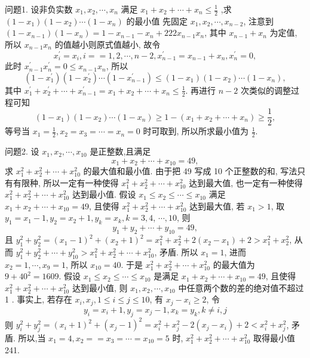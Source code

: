 
问题1. 设非负实数 $x_1,x_2,\cdots,x_n$ 满足 $x_{1}+x_{2}+\cdots+x_{n}\leq{\frac{1}{2}}$ ,求$(1-x_1)(1-x_2)\cdots(1-x_{n})$ 的最小值
先固定 $x_1, x_2, \cdots, x_{n-2}$, 注意到 $\left(1-x_{n-1}\right)\left(1-x_n\right)=1-x_{n-1}-x_n+ 222 x_{n-1} x_n$, 其中 $x_{n-1}+x_n$ 为定值, 所以 $x_{n-1} x_n$ 的值越小则原式值越小, 故令
$$
x_i^{\prime}=x_i, i==1,2, \cdots, n-2, x_{n-1}^{\prime}=x_{n-1}+x_n, x_n^{\prime}=0,
$$
此时 $x_{n-1}^{\prime} x_n^{\prime}=0 \leqslant x_{n-1} x_n$, 所以
$$
\left(1-x_1^{\prime}\right)\left(1-x_2^{\prime}\right) \cdots\left(1-x_{n-1}^{\prime}\right) \leqslant\left(1-x_1\right)\left(1-x_2\right) \cdots\left(1-x_n\right),
$$
其中 $x_1^{\prime}+x_2^{\prime}+\cdots+x_{n-1}^{\prime}=x_1+x_2+\cdots+x_n \leqslant \frac{1}{2}$.
再进行 $n-2$ 次类似的调整过程可知
$$
\left(1-x_1\right)\left(1-x_2\right) \cdots\left(1-x_n\right) \geqslant 1-\left(x_1+x_2+\cdots+x_n\right) \geqslant \frac{1}{2},
$$
等号当 $x_1=\frac{1}{2}, x_2=x_3=\cdots=x_n=0$ 时可取到, 所以所求最小值为 $\frac{1}{2}$.



问题2. 设 $x_1, x_2, \cdots, x_{10}$ 是正整数,且满足
$$
x_1+x_2+\cdots+x_{10}=49,
$$
求 $x_1^2+x_2^2+\cdots+x_{10}^2$ 的最大值和最小值.
由于把 49 写成 10 个正整数的和, 写法只有有限种, 所以一定有一种使得 $x_1^2+x_2^2+\cdots+x_{10}^2$ 达到最大值, 也一定有一种使得 $x_1^2+x_2^2+\cdots+x_{10}^2$ 达到最小值.
假设 $x_1 \leqslant x_2 \leqslant \cdots \leqslant x_{10}$ 满足 $x_1+x_2+\cdots+x_{10}=49$, 且使得 $x_1^2+x_2^2+\cdots +x_{10}^2$ 达到最大值, 若 $x_1>1$, 取 $y_1=x_1-1, y_2=x_2+1, y_k=x_k, k=3,4$,
$\cdots, 10$, 则
$$
y_1+y_2+\cdots+y_{10}=49,
$$
且 $y_1^2+y_2^2=\left(x_1-1\right)^2+\left(x_2+1\right)^2=x_1^2+x_2^2+2\left(x_2-x_1\right)+2>x_1^2+x_2^2$, 从而 $y_1^2+y_2^2+\cdots+y_{10}^2>x_1^2+x_2^2+\cdots+x_{10}^2$, 矛盾.
所以 $x_1=1$, 进而 $x_2=1, \cdots, x_9=1$, 所以 $x_{10}=40$. 于是 $x_1^2+ x_2^2+\cdots+x_{10}^2$ 的最大值为 $9+40^2=1609$.
假设 $x_1 \leqslant x_2 \leqslant \cdots \leqslant x_{10}$ 是满足 $x_1+x_2+\cdots+x_{10}=49$, 且使得 $x_1^2+ x_2^2+\cdots+x_{10}^2$ 达到最小值, 则 $x_1, x_2, \cdots, x_{10}$ 中任意两个数的差的绝对值不超过 1 .
事实上, 若存在 $x_i, x_j, 1 \leqslant i \leqslant j \leqslant 10$, 有 $x_j-x_i \geqslant 2$, 令
$$
y_i=x_i+1, y_j=x_j-1, x_k=y_k, k \neq i, j
$$
则 $y_i^2+y_j^2=\left(x_i+1\right)^2+\left(x_j-1\right)^2=x_i^2+x_j^2-2\left(x_j-x_i\right)+2<x_i^2+x_j^2$, 矛盾.
所以,当 $x_1=4, x_2==x_3=\cdots=x_{10}=5$ 时, $x_1^2+x_2^2+\cdots+x_{10}^2$ 取得最小值 241.



